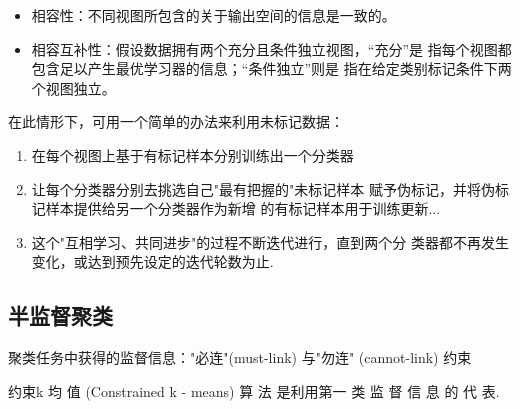 \begin{itemize}
    \item 相容性：不同视图所包含的关于输出空间的信息是一致的。
    \item 相容互补性：假设数据拥有两个充分且条件独立视图，“充分”是
    指每个视图都包含足以产生最优学习器的信息；“条件独立”则是
    指在给定类别标记条件下两个视图独立。
\end{itemize}

在此情形下，可用一个简单的办法来利用未标记数据：
\begin{enumerate}
    \item 在每个视图上基于有标记样本分别训练出一个分类器
    \item 让每个分类器分别去挑选自己"最有把握的"未标记样本
    赋予伪标记，并将伪标记样本提供给另一个分类器作为新增
    的有标记样本用于训练更新...
    \item 这个"互相学习、共同进步"的过程不断迭代进行，直到两个分
    类器都不再发生变化，或达到预先设定的迭代轮数为止. 
\end{enumerate}

\subsection{半监督聚类}
聚类任务中获得的监督信息："必连"(must-link) 与"勿连" (cannot-link) 约束

约束k 均 值 (Constrained k - means) 算 法 是利用第一 类 监 督 信 息 的 代 表. 